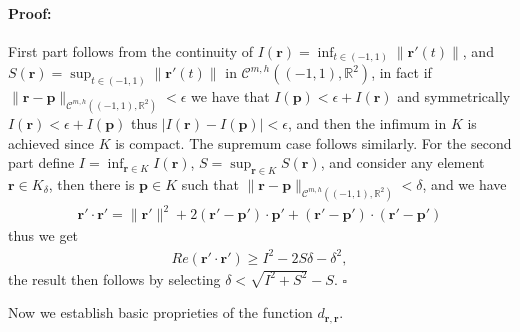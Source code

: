 \documentclass{article}
\newenvironment{proof}{\paragraph{Proof:}}{\hfill$\square$}
\newcommand{\IR}{{\mathbb R}}
\newcommand{\bp}{{\bm p}}
\newcommand{\cmspaceh}[4]{\mathcal{C}^{#1,#2} \left( #3, #4 \right)}
\newcommand{\br}{\bm{r}}
\begin{document}
\begin{proof}
First part follows from the continuity of $I(\br) = \inf_{t \in (-1,1)} \| \br'(t)\|$, and $S(\br) = \sup_{t \in (-1,1)} \| \br'(t)\|$ in $\cmspaceh{m}{h}{(-1,1)}{\IR^2}$, in fact if $\| \br -\bp \|_{\cmspaceh{m}{h}{(-1,1)}{\IR^2}}< \epsilon$ we have that 
$I(\bp)  < \epsilon + I(\br)$
and symmetrically 
$
I(\br)  < \epsilon + I(\bp)
$
thus $|I(\br) - I(\bp)| < \epsilon$, and then the infimum in $K$ is achieved since $K$ is compact. The supremum case follows similarly. For the second part define $I = \inf_{\br \in K } I(\br)$, $S =\sup_{\br \in K } S(\br)$, and consider any element $\br \in K_\delta$, then there is $\bp \in K$ such that $\| \br -\bp \|_{\cmspaceh{m}{h}{(-1,1)}{\IR^2}} < \delta$, and we have 
\begin{align*}
\br' \cdot \br' = \|\br'\|^2+ 2(\br' -\bp')\cdot \bp' +(\br'-\bp')\cdot(\br'-\bp') 
\end{align*}
thus we get
\begin{align*}
Re(\br' \cdot \br') \geq I^2 - 2S\delta -\delta^2, \end{align*}
the result then follows by selecting $\delta < \sqrt{I^2+S^2}-S$.
\end{proof} 

Now we establish basic proprieties of the function $d_{\br,\br}$. 
\end{document}
